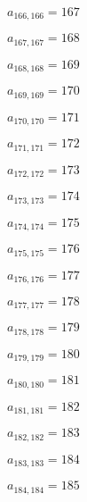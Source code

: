 \documentclass[a4paper,12pt]{article}
\begin{document}
$a _{ 166, 166 } = 167$

$a _{ 167, 167 } = 168$

$a _{ 168, 168 } = 169$

$a _{ 169, 169 } = 170$

$a _{ 170, 170 } = 171$

$a _{ 171, 171 } = 172$

$a _{ 172, 172 } = 173$

$a _{ 173, 173 } = 174$

$a _{ 174, 174 } = 175$

$a _{ 175, 175 } = 176$

$a _{ 176, 176 } = 177$

$a _{ 177, 177 } = 178$

$a _{ 178, 178 } = 179$

$a _{ 179, 179 } = 180$

$a _{ 180, 180 } = 181$

$a _{ 181, 181 } = 182$

$a _{ 182, 182 } = 183$

$a _{ 183, 183 } = 184$

$a _{ 184, 184 } = 185$
\end{document}
